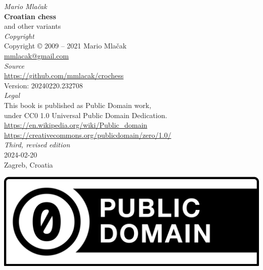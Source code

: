 \documentclass[a5paper,12pt]{book} %
\begin{document}
\thispagestyle{empty}
\vspace*{0.7\baselineskip}
\begin{center}
    \emph{Mario Mlačak} \\
    \textbf{Croatian chess} \\
    and other variants \\ [2.0em]

    \emph{Copyright} \\
    Copyright \copyright \hspace{0.2ex} 2009 -- 2021 Mario Mlačak \\
    \href{mailto:mmlacak@gmail.com}{mmlacak@gmail.com} \\ [2.0em]

    \emph{Source} \\
    \href{https://github.com/mmlacak/crochess}{https://github.com/mmlacak/crochess} \\
    Version: 20240220.232708 \\ [2.0em] %

    \emph{Legal} \\
    This book is published as Public Domain work, \\
    under CC0 1.0 Universal Public Domain Dedication. \\
    \href{https://en.wikipedia.org/wiki/Public\_domain}{https://en.wikipedia.org/wiki/Public\_domain} \\
    \href{https://creativecommons.org/publicdomain/zero/1.0/}{https://creativecommons.org/publicdomain/zero/1.0/} \\ [2.0em]

    \emph{Third, revised edition} \\
    2024-02-20 \\ %
    Zagreb, Croatia

    \vfill
    \includegraphics[height=1.0\baselineskip, keepaspectratio=true]{CC0_button.svg.png}
    \vspace*{0.7\baselineskip}
\end{center}
\clearpage %
\end{document}
